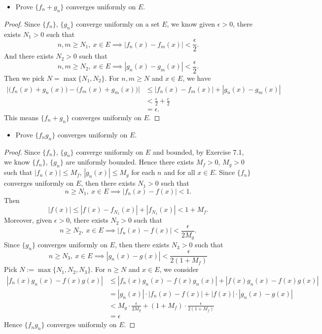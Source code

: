 \begin{Exercise}
	\begin{itemize}
		\item Prove $\{f_n+g_n\}$ converges uniformly on $E$.
	\end{itemize}
	\begin{proof}
		Since $\{f_n\}$, $\{g_n\}$ converge uniformly on a set $E$, we know given $\epsilon>0$, there exists $N_1>0$ such that
		$$
		n,m\geq N_1,\ x\in E \implies |f_n(x) - f_m(x)| < \frac{\epsilon}{2}.
		$$
		And there exists $N_2>0$ such that
		$$
		n,m\geq N_2,\ x\in E \implies |g_n(x) - g_m(x)| < \frac{\epsilon}{2}.
		$$
		Then we pick $N = \max\{N_1,N_2\}$. For $n,m\geq N$ and $x\in E$, we have
		\begin{align*}
		\Big| \big( f_n(x) + g_n(x) \big) - \big( f_m(x) + g_m(x) \big) \Big|
		&\leq | f_n(x) - f_m(x) | + | g_n(x) - g_m(x) | \\
		&< \frac{\epsilon}{2} + \frac{\epsilon}{2} \\
		&= \epsilon.
		\end{align*}
		This means $\{f_n + g_n\}$ converges uniformly on $E$.
	\end{proof}
	
	\begin{itemize}
		\item Prove $\{f_n g_n\}$ converges uniformly on $E$.
	\end{itemize}
	\begin{proof}
		Since $\{f_n\}$, $\{g_n\}$ converge uniformly on $E$ and bounded, by Exercise 7.1, we know $\{f_n\}$, $\{g_n\}$ are uniformly bounded.
		Hence there exists $M_f > 0$, $M_g > 0$ such that $|f_n(x)| \leq M_f$, $|g_n(x)| \leq M_g$ for each $n$ and for all $x\in E$.
		Since $\{f_n\}$ converges uniformly on $E$, then there exists $N_1 > 0$ such that
		$$
		n\geq N_1,\ x\in E \implies |f_n(x) - f(x)| < 1.
		$$
		Then
		$$
		|f(x)| 
		\leq |f(x) - f_{N_1}(x)| + |f_{N_1}(x)| 
		<  1 + M_f.
		$$
		Moreover, given $\epsilon>0$, there exists $N_2 > 0$ such that
		$$
		n\geq N_2,\ x\in E \implies |f_n(x) - f(x)| < \frac{\epsilon}{2M_g}.
		$$
		Since $\{g_n\}$ converges uniformly on $E$, then there exists $N_3 > 0$ such that
		$$
		n\geq N_3,\ x\in E \implies |g_n(x) - g(x)| < \frac{\epsilon}{2(1+M_f)}
		$$
		Pick $N := \max\{N_1,N_2,N_3\}$.
		For $n\geq N$ and $x\in E$, we consider
		\begin{align*}
		|f_n(x) g_n(x) - f(x) g(x)|
		&\leq |f_n(x) g_n(x) - f(x) g_n(x)| + |f(x) g_n(x) - f(x) g(x)| \\
		&= |g_n(x)| \cdot |f_n(x) - f(x)| + |f(x)| \cdot |g_n(x) - g(x)| \\
		&< M_g \cdot \frac{\epsilon}{2M_g} + (1+M_f) \cdot \frac{\epsilon}{2(1+M_f)} \\
		&= \epsilon
		\end{align*}
		Hence $\{f_n g_n\}$ converges uniformly on $E$.
	\end{proof}
\end{Exercise}